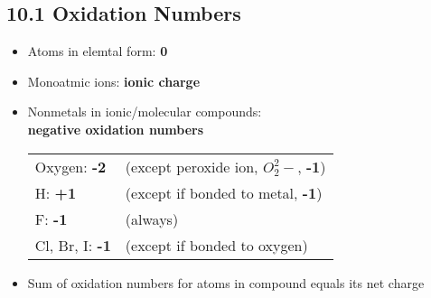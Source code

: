 \subsection{10.1 Oxidation Numbers}
    \begin{itemize}
        \itemsep0em
        \item Atoms in elemtal form: \textbf{0}
        \item Monoatmic ions: \textbf{ionic charge}
        \item Nonmetals in ionic/molecular compounds:\\ \textbf{negative oxidation numbers}\\
            \begin{tabular}{l l}
                Oxygen: \textbf{-2} & (except peroxide ion, $O_2^2-$, \textbf{-1})\\
                H: \textbf{+1} & (except if bonded to metal, \textbf{-1})\\
                F: \textbf{-1} & (always)\\
                Cl, Br, I: \textbf{-1} & (except if bonded to oxygen)
            \end{tabular}
        \item Sum of oxidation numbers for atoms in compound equals its net charge
    \end{itemize}